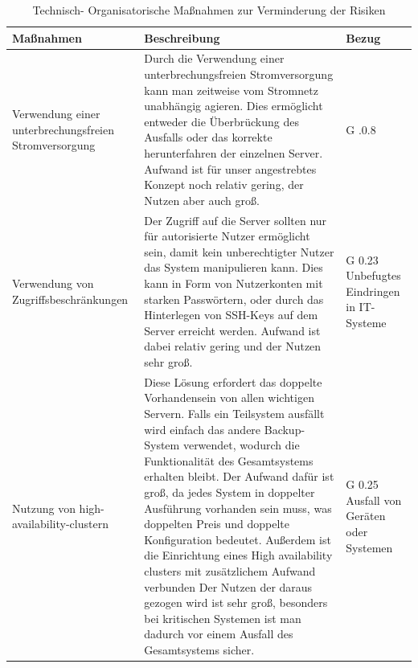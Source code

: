 \documentclass[a4paper,
    11pt,
    headings=small,
    ngerman,
    listof=totoc,
    numbers=noenddot]{scrreprt}[2021/11/13]
\begin{document}
\begin{longtable}{p{}p{}p{}}
  \caption{Technisch- Organisatorische Maßnahmen zur Verminderung der Risiken
  }                                                                                                                                                                                                                                                                                                                                                                                                                                                                                                                                            \\
  Maßnahmen                                                                                                                                       & Beschreibung                                                                                                                                                                                                                                                                                                                                  & Bezug                                      \\
  \hline
  Verwendung einer unterbrechungsfreien Stromversorgung                                                                                           & Durch die Verwendung einer unterbrechungsfreien Stromversorgung kann man zeitweise vom Stromnetz unabhängig agieren. Dies ermöglicht entweder die Überbrückung des Ausfalls oder das korrekte herunterfahren der einzelnen Server. Aufwand ist für unser angestrebtes Konzept noch relativ gering, der Nutzen aber auch groß.                 & G .0.8                                     \\
  Verwendung von Zugriffsbeschränkungen                                                                                                           & Der Zugriff auf die Server sollten nur für autorisierte Nutzer ermöglicht sein, damit kein unberechtigter Nutzer das System manipulieren kann. Dies kann in Form von Nutzerkonten mit starken Passwörtern, oder durch das Hinterlegen von SSH-Keys auf dem Server erreicht werden. Aufwand ist dabei relativ gering und der Nutzen sehr groß. & G 0.23 Unbefugtes Eindringen in IT-Systeme \\
  Nutzung von high-availability-clustern                                                                                                          & Diese Lösung erfordert das doppelte Vorhandensein von allen wichtigen Servern. Falls ein Teilsystem ausfällt wird einfach das andere Backup-System verwendet, wodurch die Funktionalität des Gesamtsystems erhalten bleibt.
  Der Aufwand dafür ist groß, da jedes System in doppelter Ausführung vorhanden sein muss, was doppelten Preis und doppelte Konfiguration bedeutet. Außerdem ist die Einrichtung eines High availability clusters mit zusätzlichem Aufwand verbunden
  Der Nutzen der daraus gezogen wird ist sehr groß, besonders bei kritischen Systemen ist man dadurch vor einem Ausfall des Gesamtsystems sicher. & G 0.25 Ausfall von Geräten oder Systemen
  \label{tab:TOM}
\end{longtable}
\end{document}
